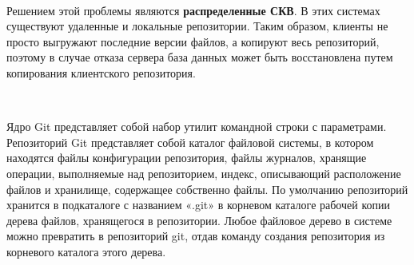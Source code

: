\documentclass{article}
\begin{document}
~\

Решением этой проблемы являются \textbf{распределенные СКВ}. В этих системах существуют удаленные и локальные репозитории.
Таким образом, клиенты не просто выгружают последние версии файлов, а копируют весь репозиторий, поэтому в случае отказа сервера база данных может быть восстановлена путем копирования клиентского репозитория.


\begin{figure}[h]
\end{figure}

~\

Ядро Git представляет собой набор утилит командной строки с параметрами.
Репозиторий Git представляет собой каталог файловой системы, в котором находятся файлы конфигурации репозитория, файлы журналов, хранящие операции, выполняемые над репозиторием, индекс, описывающий расположение файлов и хранилище, содержащее собственно файлы. По умолчанию репозиторий хранится в подкаталоге с названием «.git» в корневом каталоге рабочей копии дерева файлов, хранящегося в репозитории. Любое файловое дерево в системе можно превратить в репозиторий git, отдав команду создания репозитория из корневого каталога этого дерева.
\end{document}
